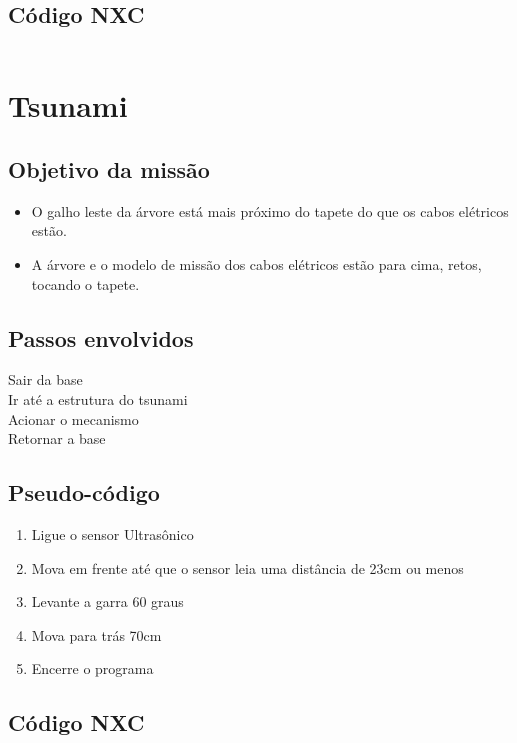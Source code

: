 \documentclass{article}
\begin{document}
	\subsection{Código NXC}
		\inputminted[linenos, frame = single]{c}{../GalhoArvore.nxc}

\newpage
\section{Tsunami}
	\subsection{Objetivo da missão}
		\begin{itemize}
			\item O galho leste da árvore está mais próximo do tapete do que os 
			cabos elétricos estão.
			\item A árvore e o modelo de missão dos cabos elétricos estão para 
			cima, retos, tocando o tapete.
		\end{itemize}

	\subsection{Passos envolvidos}
		Sair da base\\
		Ir até a estrutura do tsunami\\
		Acionar o mecanismo\\
		Retornar a base\\

	\subsection{Pseudo-código}
		\begin{enumerate}
			\item Ligue o sensor Ultrasônico
			\item Mova em frente até que o sensor leia uma distância de 23cm ou 
			menos
			\item Levante a garra 60 graus
			\item Mova para trás 70cm
			\item Encerre o programa
		\end{enumerate}

	\subsection{Código NXC}
		\inputminted[linenos, frame = single]{c}{../Ondas.nxc}
\end{document}
